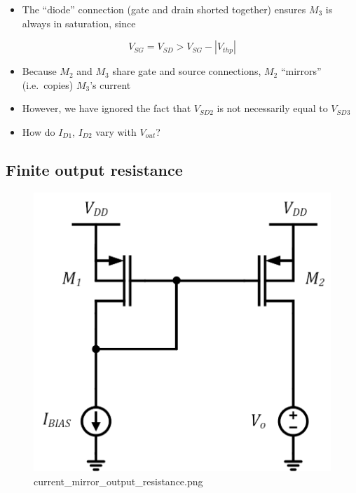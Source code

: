 \documentclass[11pt]{article}
\providecommand{\tightlist}{%
      \setlength{\itemsep}{0pt}\setlength{\parskip}{0pt}}
\begin{document}
    \begin{itemize}
\tightlist
\item
  The ``diode'' connection (gate and drain shorted together) ensures
  \(M_3\) is always in saturation, since
\end{itemize}

\begin{equation}
V_{SG} = V_{SD} > V_{SG} - |V_{thp}|
\end{equation}

\begin{itemize}
\tightlist
\item
  Because \(M_2\) and \(M_3\) share gate and source connections, \(M_2\)
  ``mirrors'' (i.e.~copies) \(M_3\)'s current
\item
  However, we have ignored the fact that \(V_{SD2}\) is not necessarily
  equal to \(V_{SD3}\)
\item
  How do \(I_{D1}\), \(I_{D2}\) vary with \(V_{out}\)?
\end{itemize}

    \hypertarget{finite-output-resistance}{%
\subsection{Finite output resistance}\label{finite-output-resistance}}

    \begin{figure}
\centering
\includegraphics{current_mirror_output_resistance.png}
\caption{current\_mirror\_output\_resistance.png}
\end{figure}
\end{document}
